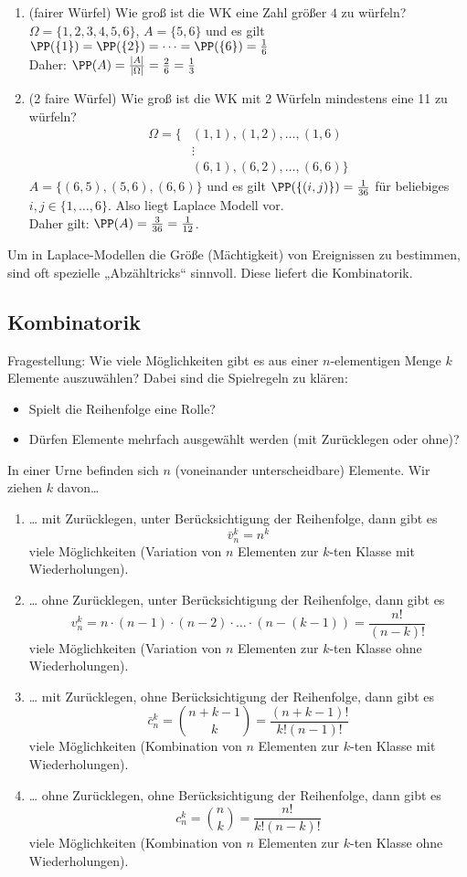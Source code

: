 \documentclass{scrreprt}
\renewenvironment{anumerate}{\begin{enumerate}[label=(\alph*)]}{\end{enumerate}} %
\begin{document}
\begin{anumerate}
\item (fairer Würfel) Wie groß ist die WK eine Zahl größer $4$ zu würfeln?\\
$\Omega = \{1,2,3,4,5,6\}$, $A=\{5,6\}$ und es gilt $\PP(\{1\})=\PP(\{2\})=\dots=\PP(\{6\})=\frac{1}{6}$\\
Daher: $\PP(A) = \frac{|A|}{|\Omega|}=\frac{2}{6}=\frac{1}{3}$
\item (2 faire Würfel) Wie groß ist die WK mit 2 Würfeln mindestens eine 11 zu würfeln?
\begin{align*}
\Omega=\{ & (1,1), (1,2), \dots , (1,6)\\
&\vdots\\
&(6,1), (6,2), \dots , (6,6)\}
\end{align*}
$A=\{(6,5), (5,6), (6,6)\}$ und es gilt $\PP(\{(i,j)\})=\frac{1}{36}$ für beliebiges $i,j \in \{1,\dots,6\}$. Also liegt Laplace Modell vor.\\
Daher gilt: $\PP(A) = \frac{3}{36}= \frac{1}{12}$.
\end{anumerate}
Um in Laplace-Modellen die Größe (Mächtigkeit) von Ereignissen zu bestimmen, sind oft spezielle „Abzähltricks“ sinnvoll. Diese liefert die Kombinatorik.

\subsection{Kombinatorik}
Fragestellung: Wie viele Möglichkeiten gibt es aus einer $n$-elementigen Menge $k$ Elemente auszuwählen? Dabei sind die Spielregeln zu klären:
\begin{itemize}
\item Spielt die Reihenfolge eine Rolle?
\item Dürfen Elemente mehrfach ausgewählt werden (mit Zurücklegen oder ohne)?
\end{itemize}

 In einer Urne befinden sich $n$ (voneinander unterscheidbare) Elemente. Wir ziehen $k$ davon…
\begin{anumerate}
\item … mit Zurücklegen, unter Berücksichtigung der Reihenfolge, dann gibt es
\[\bar v_n^k = n^k\]
viele Möglichkeiten (Variation von $n$ Elementen zur $k$-ten Klasse mit Wiederholungen).
\item … ohne Zurücklegen, unter Berücksichtigung der Reihenfolge, dann gibt es
\[v_n^k=n\cdot (n-1) \cdot (n-2) \cdot \dots \cdot (n-(k-1))=\frac{n!}{(n-k)!}\]
viele Möglichkeiten (Variation von $n$ Elementen zur $k$-ten Klasse ohne Wiederholungen).
\item … mit Zurücklegen, ohne Berücksichtigung der Reihenfolge, dann gibt es
\[\bar c_n^k=\binom{n+k-1}{k}=\frac{(n+k-1)!}{k!(n-1)!}\]
viele Möglichkeiten (Kombination von $n$ Elementen zur $k$-ten Klasse mit Wiederholungen).
\item … ohne Zurücklegen, ohne Berücksichtigung der Reihenfolge, dann gibt es
\[c_n^k=\binom{n}{k}=\frac{n!}{k!(n-k)!}\]
viele Möglichkeiten (Kombination von $n$ Elementen zur $k$-ten Klasse ohne Wiederholungen).
\end{anumerate}
\end{document}
